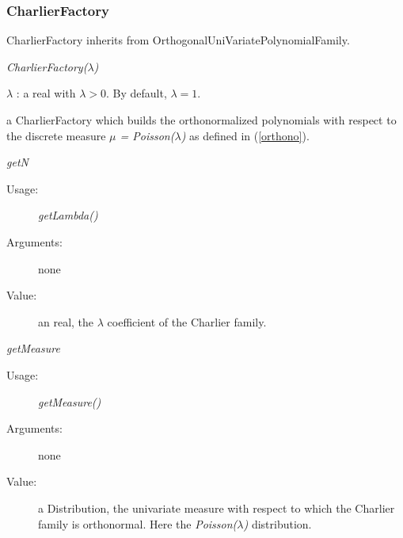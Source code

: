 \newpage
\subsubsection{CharlierFactory}


CharlierFactory inherits from OrthogonalUniVariatePolynomialFamily.

\begin{description}
\item[Usage:] \textit{CharlierFactory($\lambda$)}


\item[Arguments:]  $\lambda$ : a real with $\lambda > 0$. By default, $\lambda = 1$.


\item[Value:]  a CharlierFactory which builds the orthonormalized polynomials with respect to the discrete measure \textit{$\mu$ = Poisson($\lambda$)} as defined in (\ref{orthono}).

\item[Some methods :]  \rule{0pt}{1em}

\begin{description}

\item \textit{getN}
\begin{description}
\item[Usage:] \textit{getLambda()}
\item[Arguments:] none
\item[Value:]  an real, the $\lambda$ coefficient of the Charlier family.
\end{description}
\bigskip

\item \textit{getMeasure}
\begin{description}
\item[Usage:] \textit{getMeasure()}
\item[Arguments:] none
\item[Value:]  a Distribution, the univariate measure with respect to which the Charlier family is orthonormal. Here the \textit{Poisson($\lambda$)} distribution.
\end{description}
\bigskip

\end{description}
\end{description}



